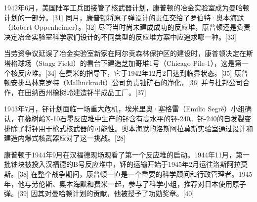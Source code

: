 1942年6月，美国陆军工兵团接管了核武器计划，康普顿的冶金实验室成为曼哈顿计划的一部分。[31] 同月，康普顿将原子弹设计的责任交给了罗伯特·奥本海默（Robert Oppenheimer）。[32] 尽管当时尚未建成成功的反应堆，康普顿还是负责决定冶金实验室科学家们设计的不同类型的反应堆方案中应追求哪一种。[33]

当劳资争议延误了冶金实验室新家在阿尔贡森林保护区的建设时，康普顿决定在斯塔格球场（Stagg Field）的看台下建造芝加哥堆1号（Chicago Pile-1），这是第一个核反应堆。[34] 在费米的指导下，它于1942年12月2日达到临界状态。[35] 康普顿安排马林克罗特（Mallinckrodt）公司负责铀矿石的净化，[36] 并与杜邦公司合作，在田纳西州橡树岭建造钚半成品工厂。[37]

1943年7月，钚计划面临一场重大危机，埃米里奥·塞格雷（Emilio Segrè）小组确认，在橡树岭X-10石墨反应堆中生产的钚含有高水平的钚-240。钚-240的自发裂变排除了将钚用于枪式核武器的可能性。奥本海默的洛斯阿拉莫斯实验室通过设计和建造内爆式核武器应对了这一挑战。[28]


康普顿于1944年9月在汉福德现场观看了第一个反应堆的启动。1944年11月，第一批铀块被投入汉福德的B号反应堆中，钚的运输开始于1945年2月运往洛斯阿拉莫斯。[38] 在整个战争期间，康普顿一直是一个重要的科学顾问和行政管理者。1945年，他与劳伦斯、奥本海默和费米一起，参与了科学小组，推荐对日本使用原子弹。[39] 因其对曼哈顿计划的贡献，他被授予了功勋奖章。[40]